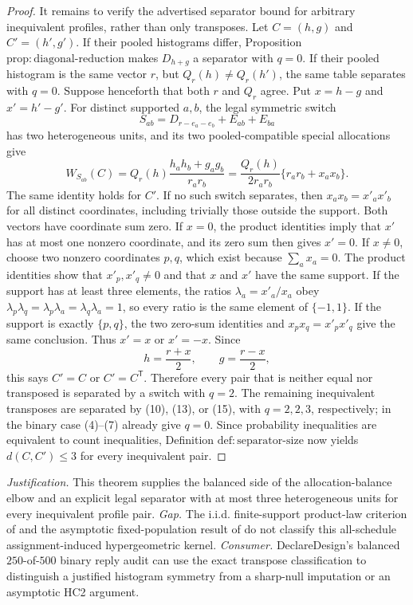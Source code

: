 \documentclass{article}
\begin{document}
\begin{proof}
It remains to verify the advertised separator bound for arbitrary inequivalent profiles, rather than only transposes. Let \(C=(h,g)\) and \(C'=(h',g')\). If their pooled histograms differ, Proposition \(\mathrm{prop{:}diagonal\text{-}reduction}\) makes \(D_{h+g}\) a separator with \(q=0\). If their pooled histogram is the same vector \(r\), but \(Q_r(h)\neq Q_r(h')\), the same table separates with \(q=0\). Suppose henceforth that both \(r\) and \(Q_r\) agree. Put \(x=h-g\) and \(x'=h'-g'\). For distinct supported \(a,b\), the legal symmetric switch
\[
 S_{ab}=D_{r-e_a-e_b}+E_{ab}+E_{ba}
\]
has two heterogeneous units, and its two pooled-compatible special allocations give
\[
 W_{S_{ab}}(C)
 =Q_r(h)\frac{h_ah_b+g_ag_b}{r_ar_b}
 =\frac{Q_r(h)}{2r_ar_b}\{r_ar_b+x_ax_b\}.
 \tag{17}
\]
The same identity holds for \(C'\). If no such switch separates, then \(x_ax_b=x'_ax'_b\) for all distinct coordinates, including trivially those outside the support. Both vectors have coordinate sum zero. If \(x=0\), the product identities imply that \(x'\) has at most one nonzero coordinate, and its zero sum then gives \(x'=0\). If \(x\neq0\), choose two nonzero coordinates \(p,q\), which exist because \(\sum_a x_a=0\). The product identities show that \(x'_p,x'_q\neq0\) and that \(x\) and \(x'\) have the same support. If the support has at least three elements, the ratios \(\lambda_a=x'_a/x_a\) obey \(\lambda_p\lambda_q=\lambda_p\lambda_a=\lambda_q\lambda_a=1\), so every ratio is the same element of \(\{-1,1\}\). If the support is exactly \(\{p,q\}\), the two zero-sum identities and \(x_px_q=x'_px'_q\) give the same conclusion. Thus \(x'=x\) or \(x'=-x\). Since
\[
 h=\frac{r+x}{2},\qquad g=\frac{r-x}{2},
\]
this says \(C'=C\) or \(C'=C^{\mathsf T}\). Therefore every pair that is neither equal nor transposed is separated by a switch with \(q=2\). The remaining inequivalent transposes are separated by (10), (13), or (15), with \(q=2,2,3\), respectively; in the binary case (4)--(7) already give \(q=0\). Since probability inequalities are equivalent to count inequalities, Definition \(\mathrm{def{:}separator\text{-}size}\) now yields \(d(C,C')\leq3\) for every inequivalent pair.
\end{proof}
\par\smallskip\noindent \textit{Justification.} This theorem supplies the balanced side of the allocation-balance elbow and an explicit legal separator with at most three heterogeneous units for every inequivalent profile pair. \textit{Gap.} The i.i.d. finite-support product-law criterion of \cite{DutzZhang2026} and the asymptotic fixed-population result of \cite{WuDing2021} do not classify this all-schedule assignment-induced hypergeometric kernel. \textit{Consumer.} DeclareDesign's balanced \(250\)-of-\(500\) binary reply audit can use the exact transpose classification to distinguish a justified histogram symmetry from a sharp-null imputation or an asymptotic HC2 argument.
\end{document}
